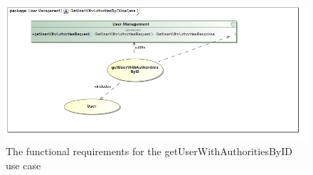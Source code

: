 \begin{figure}[H]
	\begin{center}
		\includegraphics[scale=0.5]{../Diagrams and Charts/Users/Get User With Authorities By ID Use Case.jpg}
		\caption{The functional requirements for the getUserWithAuthoritiesByID use case}
		\label{getUserWithAuthoritiesByIDUseCase}
	\end{center}	
\end{figure}